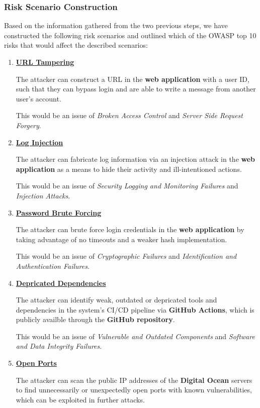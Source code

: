 \subsubsection{Risk Scenario Construction}
Based on the information gathered from the two previous steps, we have constructed the following risk scenarios and outlined which of the OWASP top 10 risks that would affect the described scenarios:
\begin{enumerate}
    \item \textbf{\underline{URL Tampering}}

    The attacker can construct a URL in the \textbf{web application} with a user ID, such that they can bypass login and are able to write a message from another user’s account.

    This would be an issue of \textit{Broken Access Control} and \textit{Server Side Request Forgery}.
    \item \textbf{\underline{Log Injection}}

    The attacker can fabricate log information via an injection attack in the \textbf{web application} as a means to hide their activity and ill-intentioned actions.

    This would be an issue of \textit{Security Logging and Monitoring Failures} and \textit{Injection Attacks}.
    \item \textbf{\underline{Password Brute Forcing}}

    The attacker can brute force login credentials in the \textbf{web application} by taking advantage of no timeouts and a weaker hash implementation.

    This would be an issue of \textit{Cryptographic Failures} and \textit{Identification and Authentication Failures}.
    \item \textbf{\underline{Depricated Dependencies}}

    The attacker can identify weak, outdated or depricated tools and dependencies in the system's CI/CD pipeline via \textbf{GitHub Actions}, which is publicly availble through the \textbf{GitHub repository}.

    This would be an issue of \textit{Vulnerable and Outdated Components} and \textit{Software and Data Integrity Failures}.
    \item \textbf{\underline{Open Ports}}

    The attacker can scan the public IP addresses of the \textbf{Digital Ocean} servers to find unnecessarily or unexpectedly open ports with known vulnerabilities, which can be exploited in further attacks.


\end{enumerate}
